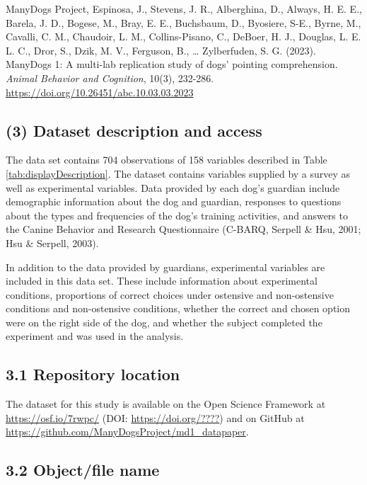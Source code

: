 \documentclass[
  pub,floatsintext]{apa6}
\begin{document}
ManyDogs Project, Espinosa, J., Stevens, J. R., Alberghina, D., Always, H. E. E., Barela, J. D., Bogese, M., Bray, E. E., Buchsbaum, D., Byosiere, S-E., Byrne, M., Cavalli, C. M., Chaudoir, L. M., Collins-Pisano, C., DeBoer, H. J., Douglas, L. E. L. C., Dror, S., Dzik, M. V., Ferguson, B., \ldots{} Zylberfuden, S. G. (2023). ManyDogs 1: A multi-lab replication study of dogs' pointing comprehension. \emph{Animal Behavior and Cognition}, 10(3), 232-286.
\url{https://doi.org/10.26451/abc.10.03.03.2023}

\hypertarget{dataset-description-and-access}{%
\subsection{(3) Dataset description and access}\label{dataset-description-and-access}}

The data set contains 704 observations of 158 variables described in Table \ref{tab:displayDescription}. The dataset contains variables supplied by a survey as well as experimental variables. Data provided by each dog's guardian include demographic information about the dog and guardian, responses to questions about the types and frequencies of the dog's training activities, and answers to the Canine Behavior and Research Questionnaire (C-BARQ, Serpell \& Hsu, 2001; Hsu \& Serpell, 2003).

In addition to the data provided by guardians, experimental variables are included in this data set. These include information about experimental conditions, proportions of correct choices under ostensive and non-ostensive conditions and non-ostensive conditions, whether the correct and chosen option were on the right side of the dog, and whether the subject completed the experiment and was used in the analysis.

\hypertarget{repository-location}{%
\subsection{3.1 Repository location}\label{repository-location}}

The dataset for this study is available on the Open Science Framework at \url{https://osf.io/7rwpc/} (DOI: \url{https://doi.org/????}) and on GitHub at \url{https://github.com/ManyDogsProject/md1_datapaper}.

\hypertarget{objectfile-name}{%
\subsection{3.2 Object/file name}\label{objectfile-name}}
\end{document}
